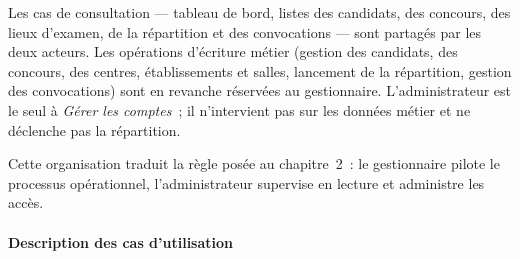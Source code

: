 \begin{onehalfspace}
Les cas de consultation --- tableau de bord, listes des candidats, des concours, des lieux d'examen, de la répartition et des convocations --- sont partagés par les deux acteurs. Les opérations d'écriture métier (gestion des candidats, des concours, des centres, établissements et salles, lancement de la répartition, gestion des convocations) sont en revanche réservées au gestionnaire. L'administrateur est le seul à \textit{Gérer les comptes}~; il n'intervient pas sur les données métier et ne déclenche pas la répartition.

Cette organisation traduit la règle posée au chapitre~2~: le gestionnaire pilote le processus opérationnel, l'administrateur supervise en lecture et administre les accès.

\paragraph{Description des cas d'utilisation}


\end{onehalfspace}
